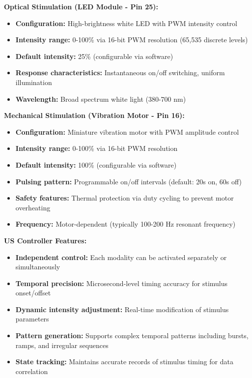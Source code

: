 \documentclass[11pt,a4paper]{article}
\begin{document}
\textbf{Optical Stimulation (LED Module - Pin 25):}
\begin{itemize}
\item \textbf{Configuration:} High-brightness white LED with PWM intensity control
\item \textbf{Intensity range:} 0-100\% via 16-bit PWM resolution (65,535 discrete levels)
\item \textbf{Default intensity:} 25\% (configurable via software)
\item \textbf{Response characteristics:} Instantaneous on/off switching, uniform illumination
\item \textbf{Wavelength:} Broad spectrum white light (380-700 nm)
\end{itemize}

\textbf{Mechanical Stimulation (Vibration Motor - Pin 16):}
\begin{itemize}
\item \textbf{Configuration:} Miniature vibration motor with PWM amplitude control
\item \textbf{Intensity range:} 0-100\% via 16-bit PWM resolution
\item \textbf{Default intensity:} 100\% (configurable via software)
\item \textbf{Pulsing pattern:} Programmable on/off intervals (default: 20s on, 60s off)
\item \textbf{Safety features:} Thermal protection via duty cycling to prevent motor overheating
\item \textbf{Frequency:} Motor-dependent (typically 100-200 Hz resonant frequency)
\end{itemize}

\textbf{US Controller Features:}
\begin{itemize}
\item \textbf{Independent control:} Each modality can be activated separately or simultaneously
\item \textbf{Temporal precision:} Microsecond-level timing accuracy for stimulus onset/offset
\item \textbf{Dynamic intensity adjustment:} Real-time modification of stimulus parameters
\item \textbf{Pattern generation:} Supports complex temporal patterns including bursts, ramps, and irregular sequences
\item \textbf{State tracking:} Maintains accurate records of stimulus timing for data correlation
\end{itemize}
\end{document}
